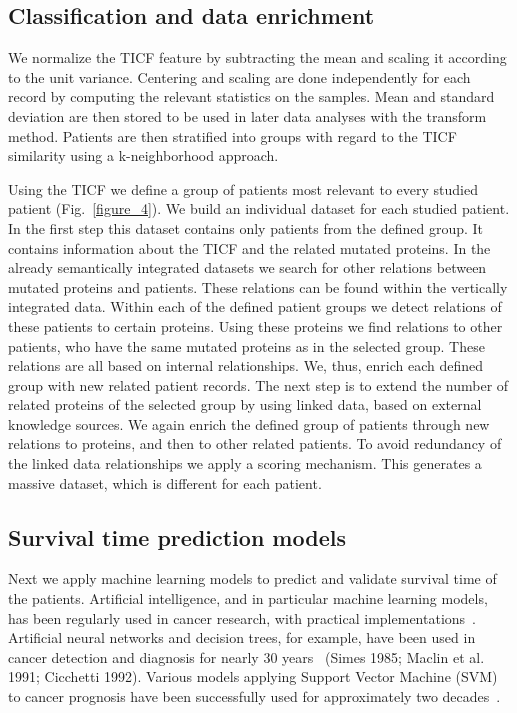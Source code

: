 \documentclass{bmcart}
\begin{document}
\subsection{Classification and data enrichment }

We normalize the TICF feature by subtracting the mean and scaling it
according to the unit variance. Centering and scaling are done
independently for each record by computing the relevant statistics on
the samples. Mean and standard deviation are then stored to be used in
later data analyses with the transform method. Patients are then
stratified into groups with regard to the TICF similarity using a
k-neighborhood approach. 

Using the TICF we define a group of patients most relevant to every
studied patient (Fig.~\ref{figure_4}). We build an individual dataset for each
studied patient. In the first step this dataset contains only patients
from the defined group. It contains information about the TICF and the
related mutated proteins. In the already semantically integrated
datasets we search for other relations between mutated proteins and
patients. These relations can be found within the vertically integrated
data. Within each of the defined patient groups we detect relations of
these patients to certain proteins. Using these proteins we find
relations to other patients, who have the same mutated proteins as in
the selected group. These relations are all based on internal
relationships. We, thus, enrich each defined group with new related
patient records. The next step is to extend the number of related
proteins of the selected group by using linked data, based on external
knowledge sources. We again enrich the defined group of patients
through new relations to proteins, and then to other related patients.
To avoid redundancy of the linked data relationships we apply a scoring
mechanism. This generates a massive dataset, which is different for
each patient.  

\subsection{Survival time prediction models}

Next we apply machine learning models to predict and validate survival
time of the patients. Artificial intelligence, and in particular
machine learning models, has been regularly used in cancer research,
with practical implementations~\cite{18}. Artificial neural networks and
decision trees, for example, have been used in cancer detection and
diagnosis for nearly 30 years~\cite{34} (Simes 1985; Maclin et al. 1991;
Cicchetti 1992). Various models applying Support Vector Machine (SVM)
to cancer prognosis have been successfully used for approximately two
decades~\cite{17}.
\end{document}
